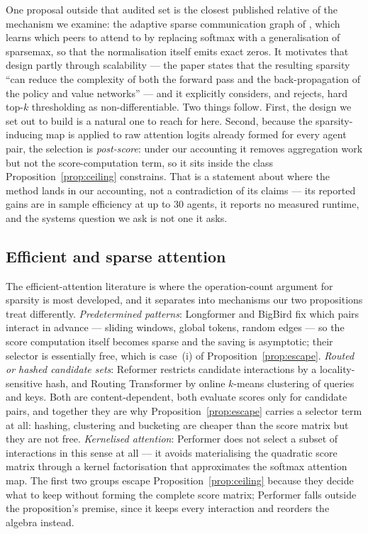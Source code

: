 One proposal outside that audited set is the closest published relative of the
mechanism we examine: the adaptive sparse communication graph of
\citet{sun2020sparsecomm}, which learns which peers to attend to by replacing
softmax with a generalisation of sparsemax, so that the normalisation itself
emits exact zeros. It motivates that design partly through scalability --- the
paper states that the resulting sparsity ``can reduce the complexity of both
the forward pass and the back-propagation of the policy and value networks'' ---
and it explicitly considers, and rejects, hard top-$k$ thresholding as
non-differentiable. Two things follow. First, the design we set out to build is
a natural one to reach for here. Second, because the sparsity-inducing map is
applied to raw attention logits already formed for every agent pair, the
selection is \emph{post-score}: under our accounting it removes aggregation
work but not the score-computation term, so it sits inside the class
Proposition~\ref{prop:ceiling} constrains. That is a statement about where the
method lands in our accounting, not a contradiction of its claims --- its
reported gains are in sample efficiency at up to $30$ agents, it reports no
measured runtime, and the systems question we ask is not one it asks.

\subsection{Efficient and sparse attention}

The efficient-attention literature is where the operation-count argument for
sparsity is most developed, and it separates into mechanisms our two
propositions treat differently. \emph{Predetermined patterns}: Longformer
\citep{beltagy2020longformer} and BigBird \citep{zaheer2020bigbird} fix which
pairs interact in advance --- sliding windows, global tokens, random edges ---
so the score computation itself becomes sparse and the saving is asymptotic;
their selector is essentially free, which is case~(i) of
Proposition~\ref{prop:escape}. \emph{Routed or hashed candidate sets}: Reformer
\citep{kitaev2020reformer} restricts candidate interactions by a
locality-sensitive hash, and Routing Transformer \citep{roy2021routing} by
online $k$-means clustering of queries and keys. Both are content-dependent,
both evaluate scores only for candidate pairs, and together they are why
Proposition~\ref{prop:escape} carries a selector term at all: hashing,
clustering and bucketing are cheaper than the score matrix but they are not
free. \emph{Kernelised attention}: Performer
\citep{choromanski2021performers} does not select a subset of interactions in
this sense at all --- it avoids materialising the quadratic score matrix
through a kernel factorisation that approximates the softmax attention map.
The first two groups escape Proposition~\ref{prop:ceiling} because they decide
what to keep without forming the complete score matrix; Performer falls outside
the proposition's premise, since it keeps every interaction and reorders the
algebra instead.

